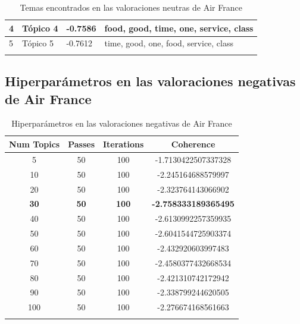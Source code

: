 \documentclass{report}
\begin{document}
{{\begin{longtable}{|p{1cm}|p{4cm}|p{4cm}|p{6cm}|}
                    \hline
                    4 & Tópico 4 & -0.7586 & food, good, time, one, service, class \\
                    \hline
                    5 & Tópico 5 & -0.7612 & time, good, one, food, service, class \\
                    \hline
                    \caption{Temas encontrados en las valoraciones neutras de Air France}
                \end{longtable}
            \clearpage\subsection{Hiperparámetros en las valoraciones negativas de Air France}
                \label{tab:hiperparametros_air_france_negativas}
                \begin{longtable}{|c|c|c|c|}
                    \hline
                    \textbf{Num Topics} & \textbf{Passes} & \textbf{Iterations} & \textbf{Coherence} \\
                    \hline
                    5 & 50 & 100 & -1.7130422507337328 \\
                    \hline
                    10 & 50 & 100 & -2.245164688579997 \\
                    \hline
                    20 & 50 & 100 & -2.323764143066902 \\
                    \hline
                    \textbf{30} & \textbf{50} & \textbf{100} & \textbf{-2.758333189365495} \\
                    \hline
                    40 & 50 & 100 & -2.6130992257359935 \\
                    \hline
                    50 & 50 & 100 & -2.6041544725903374 \\
                    \hline
                    60 & 50 & 100 & -2.432920603997483 \\
                    \hline
                    70 & 50 & 100 & -2.4580377432668534 \\
                    \hline
                    80 & 50 & 100 & -2.421310742172942 \\
                    \hline
                    90 & 50 & 100 & -2.338799244620505 \\
                    \hline
                    100 & 50 & 100 & -2.276674168561663 \\
                    \hline
                    \caption{Hiperparámetros en las valoraciones negativas de Air France}

\end{longtable}}}
\end{document}
